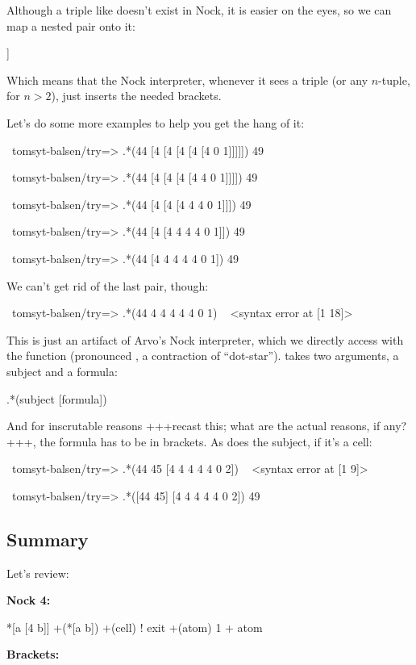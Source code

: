 Although a triple like \kode{[a b c]} doesn't exist in Nock, it is easier on the
eyes, so we can map a nested pair onto it:
\begin{code}
[a b c]         [a [b c]]
\end{code}
Which means that the Nock interpreter, whenever it sees a triple (or any
\(n\)-tuple, for \(n>2\)), just inserts the needed brackets.

Let's do some more examples to help you get the hang of it:
\begin{code}
~tomsyt-balsen/try=> .*(44 [4 [4 [4 [4 [4 0 1]]]]])
49

~tomsyt-balsen/try=> .*(44 [4 [4 [4 [4 4 0 1]]]])
49

~tomsyt-balsen/try=> .*(44 [4 [4 [4 4 4 0 1]]])
49

~tomsyt-balsen/try=> .*(44 [4 [4 4 4 4 0 1]])
49

~tomsyt-balsen/try=> .*(44 [4 4 4 4 4 0 1])
49
\end{code}

We can't get rid of the last pair, though:

\begin{code}
~tomsyt-balsen/try=> .*(44 4 4 4 4 4 0 1)
~ <syntax error at [1 18]>
\end{code}

This is just an artifact of Arvo's Nock interpreter, which we directly access
with the  function (pronounced , a contraction of ``dot-star'').  takes two
arguments, a subject and a formula:
\begin{code}
.*(subject [formula])
\end{code}
And for inscrutable reasons  +++recast this; what are the actual reasons, if any?+++, the formula has to be in brackets. As does the
subject, if it's a cell:
\begin{code}
~tomsyt-balsen/try=> .*(44 45 [4 4 4 4 4 0 2])
~ <syntax error at [1 9]>

~tomsyt-balsen/try=> .*([44 45] [4 4 4 4 4 0 2])
49
\end{code}

\subsection{Summary}

Let's review:

\textbf{Nock 4:}
\begin{code}
*[a [4 b]]         +(*[a b])
+(cell)            ! exit
+(atom)            1 + atom
\end{code}
\textbf{Brackets:}

